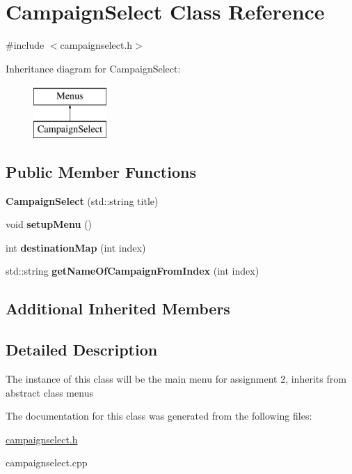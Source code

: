 \hypertarget{class_campaign_select}{}\section{Campaign\+Select Class Reference}
\label{class_campaign_select}


{\ttfamily \#include $<$campaignselect.\+h$>$}

Inheritance diagram for Campaign\+Select\+:\begin{figure}[H]
\begin{center}
\leavevmode
\includegraphics[height=2.000000cm]{class_campaign_select}
\end{center}
\end{figure}
\subsection*{Public Member Functions}
\begin{DoxyCompactItemize}
\item 
\hypertarget{class_campaign_select_a92b7e9fe25873bb47e9099f50a1962a0}{}\label{class_campaign_select_a92b7e9fe25873bb47e9099f50a1962a0} 
{\bfseries Campaign\+Select} (std\+::string title)
\item 
\hypertarget{class_campaign_select_a6bd99e582bf7989dc0e2ab52808ee74a}{}\label{class_campaign_select_a6bd99e582bf7989dc0e2ab52808ee74a} 
void {\bfseries setup\+Menu} ()
\item 
\hypertarget{class_campaign_select_a530522e4d7e1ecc43bc5ff4e96c14d40}{}\label{class_campaign_select_a530522e4d7e1ecc43bc5ff4e96c14d40} 
int {\bfseries destination\+Map} (int index)
\item 
\hypertarget{class_campaign_select_a604ccab61deb7370acdb3d555e89ea1a}{}\label{class_campaign_select_a604ccab61deb7370acdb3d555e89ea1a} 
std\+::string {\bfseries get\+Name\+Of\+Campaign\+From\+Index} (int index)
\end{DoxyCompactItemize}
\subsection*{Additional Inherited Members}


\subsection{Detailed Description}
The instance of this class will be the main menu for assignment 2, inherits from abstract class menus 

The documentation for this class was generated from the following files\+:\begin{DoxyCompactItemize}
\item 
\hyperlink{campaignselect_8h}{campaignselect.\+h}\item 
campaignselect.\+cpp\end{DoxyCompactItemize}
